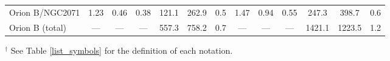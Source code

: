 \begin{table*}
{\begin{threeparttable}
\begin{tabular}{|l|cccccc|cccccc|}
Orion B/NGC2071&  1.23&  0.46&  0.38& 121.1&   262.9&   0.5&  1.47&  0.94&  0.55
&   247.3&   398.7&   0.6\\
\hdashline
Orion B (total) & --- &--- &--- & 557.3& 758.2&   0.7& ---& --- &---&1421.1&
1223.5&   1.2\\
\hline
\end{tabular}
\begin{tablenotes}
\item[$^\dag$] {See Table \ref{list_symbols} for the definition of each notation.}
\end{tablenotes}
\end{threeparttable}
}
\end{table*}

